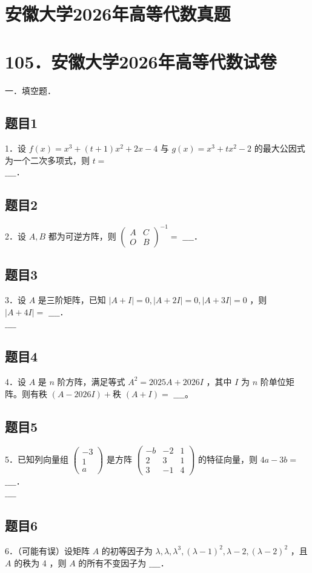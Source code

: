 \documentclass{article}
\begin{document}
\section*{安徽大学2026年高等代数真题}
\section*{105．安徽大学2026年高等代数试卷}
一．填空题．\\

\subsection{题目1}
1．设 \(f(x)=x^{3}+(t+1) x^{2}+2 x-4\) 与 \(g(x)=x^{3}+t x^{2}-2\) 的最大公因式为一个二次多项式，则 \(t=\)\\
\(\_\_\_\_\)．

\subsection{题目2}
2．设 \(A, B\) 都为可逆方阵，则 \(\left(\begin{array}{cc}A & C \\ O & B\end{array}\right)^{-1}=\) \(\_\_\_\_\)．

\subsection{题目3}
3．设 \(A\) 是三阶矩阵，已知 \(|A+I|=0,|A+2 I|=0,|A+3 I|=0\) ，则 \(|A+4 I|=\) \(\_\_\_\_\)．\\
\(\_\_\_\_\)

\subsection{题目4}
4．设 \(A\) 是 \(n\) 阶方阵，满足等式 \(A^{2}=2025 A+2026 I\) ，其中 \(I\) 为 \(n\) 阶单位矩阵。则有秩 \((A-2026 I)+\)秩 \((A+I)=\) \(\_\_\_\_\)。

\subsection{题目5}
5．已知列向量组 \(\left(\begin{array}{c}-3 \\ 1 \\ a\end{array}\right)\) 是方阵 \(\left(\begin{array}{ccc}-b & -2 & 1 \\ 2 & 3 & 1 \\ 3 & -1 & 4\end{array}\right)\) 的特征向量，则 \(4 a-3 b=\) \(\_\_\_\_\)．\\
\(\_\_\_\_\)

\subsection{题目6}
6．（可能有误）设矩阵 \(A\) 的初等因子为 \(\lambda, \lambda, \lambda^{3},(\lambda-1)^{2}, \lambda-2,(\lambda-2)^{2}\) ，且 \(A\) 的秩为 4 ，则 \(A\) 的所有不变因子为 \(\_\_\_\_\)．
\end{document}
